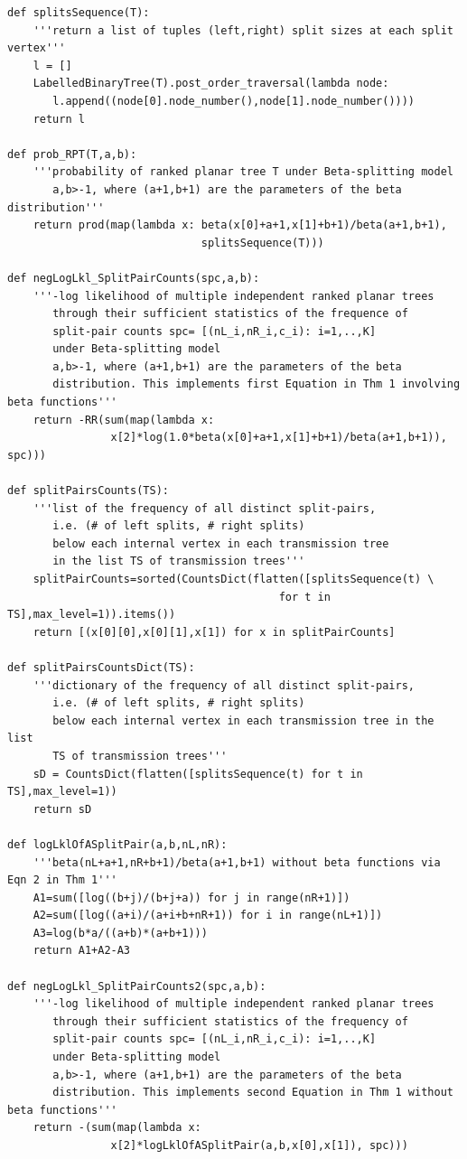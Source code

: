 \documentclass[review]{elsarticle}
\numberwithin{equation}{section}
\begin{document}
{\scriptsize
\begin{verbatim}
def splitsSequence(T):
    '''return a list of tuples (left,right) split sizes at each split vertex'''
    l = []
    LabelledBinaryTree(T).post_order_traversal(lambda node:
       l.append((node[0].node_number(),node[1].node_number())))
    return l

def prob_RPT(T,a,b):
    '''probability of ranked planar tree T under Beta-splitting model
       a,b>-1, where (a+1,b+1) are the parameters of the beta distribution'''
    return prod(map(lambda x: beta(x[0]+a+1,x[1]+b+1)/beta(a+1,b+1),
                              splitsSequence(T)))

def negLogLkl_SplitPairCounts(spc,a,b):
    '''-log likelihood of multiple independent ranked planar trees
       through their sufficient statistics of the frequence of
       split-pair counts spc= [(nL_i,nR_i,c_i): i=1,..,K]
       under Beta-splitting model
       a,b>-1, where (a+1,b+1) are the parameters of the beta
       distribution. This implements first Equation in Thm 1 involving beta functions'''
    return -RR(sum(map(lambda x:
                x[2]*log(1.0*beta(x[0]+a+1,x[1]+b+1)/beta(a+1,b+1)), spc)))

def splitPairsCounts(TS):
    '''list of the frequency of all distinct split-pairs, 
       i.e. (# of left splits, # right splits)
       below each internal vertex in each transmission tree 
       in the list TS of transmission trees'''
    splitPairCounts=sorted(CountsDict(flatten([splitsSequence(t) \
                                          for t in TS],max_level=1)).items())
    return [(x[0][0],x[0][1],x[1]) for x in splitPairCounts]

def splitPairsCountsDict(TS):
    '''dictionary of the frequency of all distinct split-pairs, 
       i.e. (# of left splits, # right splits)
       below each internal vertex in each transmission tree in the list 
       TS of transmission trees'''
    sD = CountsDict(flatten([splitsSequence(t) for t in TS],max_level=1))
    return sD

def logLklOfASplitPair(a,b,nL,nR):
    '''beta(nL+a+1,nR+b+1)/beta(a+1,b+1) without beta functions via Eqn 2 in Thm 1'''
    A1=sum([log((b+j)/(b+j+a)) for j in range(nR+1)])
    A2=sum([log((a+i)/(a+i+b+nR+1)) for i in range(nL+1)])
    A3=log(b*a/((a+b)*(a+b+1)))
    return A1+A2-A3

def negLogLkl_SplitPairCounts2(spc,a,b):
    '''-log likelihood of multiple independent ranked planar trees
       through their sufficient statistics of the frequency of
       split-pair counts spc= [(nL_i,nR_i,c_i): i=1,..,K]
       under Beta-splitting model
       a,b>-1, where (a+1,b+1) are the parameters of the beta
       distribution. This implements second Equation in Thm 1 without beta functions'''
    return -(sum(map(lambda x:
                x[2]*logLklOfASplitPair(a,b,x[0],x[1]), spc)))


\end{verbatim}}
\end{document}
